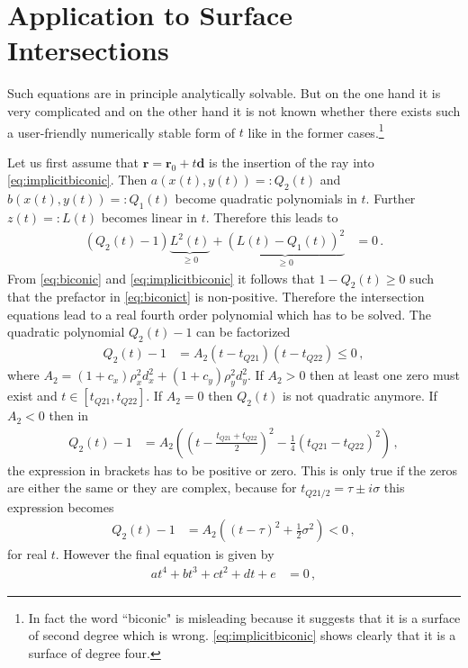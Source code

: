 \documentclass[12pt,a4paper,twoside,openright,BCOR10mm,headsepline,titlepage,abstracton,chapterprefix,final]{scrreprt}
\newcommand\Vector[1]{{\mathbf{#1}}}
\begin{document}
\section{Application to Surface Intersections}
Such equations are in principle analytically solvable. But on the one hand it is very complicated and on the other hand 
it is not known whether there exists such a user-friendly numerically stable form of $t$ like in the former cases.\footnote{
In fact the word ``biconic" is misleading because it suggests that
it is a surface of second degree which is wrong. \eqref{eq:implicitbiconic}
shows clearly that it is a surface of degree four.}

Let us first assume that $\Vector{r} = \Vector{r}_0 + t \Vector{d}$ is the insertion of the ray into
\eqref{eq:implicitbiconic}. Then $a(x(t), y(t)) =: Q_2(t)$ and $b(x(t), y(t)) =: Q_1(t)$ become quadratic polynomials 
in $t$. Further $z(t) =: L(t)$ becomes linear in $t$. Therefore this leads to
\begin{align}
 (Q_2(t) - 1) \underbrace{L^2(t)}_{\ge0} + \underbrace{(L(t) - Q_1(t))^2}_{\ge0} &= 0\,.\label{eq:biconict}
\end{align}
From \eqref{eq:biconic} and \eqref{eq:implicitbiconic} it follows that $1 - Q_2(t) \ge 0$ such that the
prefactor in \eqref{eq:biconict} is non-positive. Therefore the intersection equations lead to a real
fourth order polynomial which has to be solved. The quadratic polynomial $Q_2(t) - 1$ can be factorized
\begin{align}
 Q_2(t) - 1 &= A_2 (t - t_{Q21})(t - t_{Q22}) \le 0\,,
\end{align}
where $A_2 = (1 + c_x) \rho_x^2 d_x^2 + (1 + c_y) \rho_y^2 d_y^2$. If $A_2 > 0$ then at least one zero must exist and
$t \in [t_{Q21}, t_{Q22}]$. If $A_2 = 0$ then $Q_2(t)$ is not quadratic anymore. If $A_2 < 0$ then in 
\begin{align}
 Q_2(t) - 1 &= A_2 \left(\left(t-\frac{t_{Q21} + t_{Q22}}{2}\right)^2 - \frac{1}{4}(t_{Q21} - t_{Q22})^2\right)\,,
\end{align}
the expression in brackets has to be positive or zero. This is only true if the zeros are either the same or they are complex, because
for $t_{Q21/2} = \tau \pm i \sigma$ this expression becomes
\begin{align}
 Q_2(t) - 1 &= A_2 \left(\left(t-\tau\right)^2 + \frac{1}{2}\sigma^2\right)<0\,,
\end{align}
for real $t$. However the final equation is given by
\begin{align}
 a t^4 + b t^3 + c t^2 + d t + e &= 0\,,
\end{align}
\end{document}

